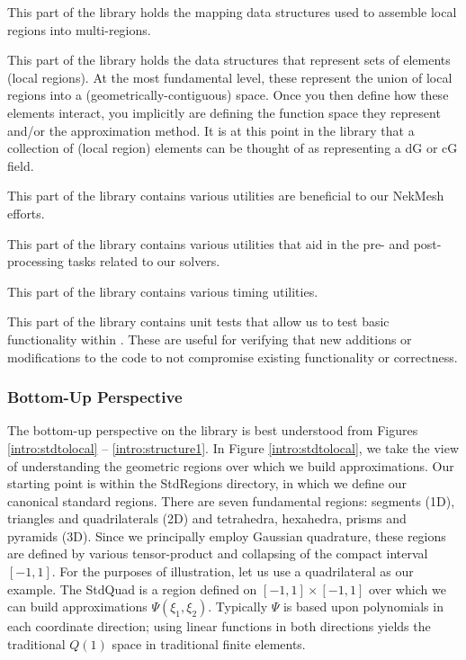  This part of the library holds the mapping data structures used to assemble local regions into multi-regions.

 This part of the library holds the data structures that represent sets of elements (local regions).  At the most fundamental 
level, these represent the union of local regions into a (geometrically-contiguous) space.  Once you then define how these elements interact, you implicitly
are defining the function space they represent and/or the approximation method.  It is at this point in the library that a collection of (local region) elements
can be thought of as representing a dG or cG field.

 This part of the library contains various utilities are beneficial to our NekMesh efforts.

 This part of the library contains various utilities that aid in the pre- and post-processing tasks related to our solvers.

 This part of the library contains various timing utilities.

 This part of the library contains unit tests that allow us to test basic functionality within {\nek}.  These are useful for verifying
that new additions or modifications to the code to not compromise existing functionality or correctness.

\subsubsection{Bottom-Up Perspective}

The bottom-up perspective on the library is best understood from Figures \ref{intro:stdtolocal} -- \ref{intro:structure1}.  In Figure \ref{intro:stdtolocal}, we
take the view of understanding the geometric regions over which we build approximations.  Our starting point is within the StdRegions directory, in which
we define our canonical standard regions.  There are seven fundamental regions:  segments (1D), triangles and quadrilaterals (2D) and tetrahedra, hexahedra,
prisms and pyramids (3D).  Since we principally employ Gaussian quadrature, these regions are defined by various tensor-product and collapsing of the
compact interval $[-1,1]$.  For the purposes of illustration, let us use a quadrilateral as our example.  The StdQuad is a region defined on $[-1,1] \times [-1,1]$
over which we can build approximations $\Psi(\xi_1,\xi_2)$.  Typically $\Psi$ is based upon polynomials in each coordinate direction; using linear functions
in both directions yields the traditional $Q(1)$ space in traditional finite elements.   

